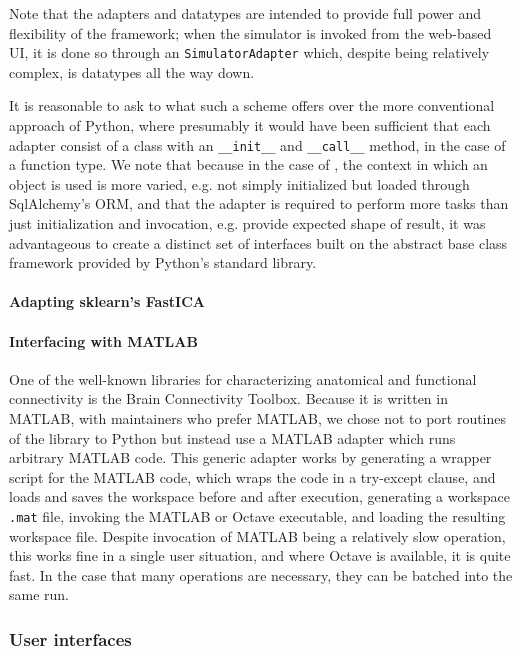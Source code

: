 
Note that the adapters and datatypes are intended to provide full 
power and flexibility of the framework; when the simulator is invoked from
the web-based UI, it is done so through an \texttt{SimulatorAdapter} which,
despite being relatively complex, is datatypes all the way down.

It is reasonable to ask to what such a scheme offers over the more 
conventional approach of Python, where presumably it would have been
sufficient that each adapter consist of a class with an \texttt{\_\_init\_\_}
and \texttt{\_\_call\_\_} method, in the case of a function type. 
We note that because in the case of \TVB, the context in which an object
is used is more varied, e.g. not simply initialized but loaded through 
SqlAlchemy's ORM, and that the adapter is required to perform more tasks
than just initialization and invocation, e.g. provide expected shape of 
result, it was advantageous to create a distinct set of interfaces built
on the abstract base class framework provided by Python's standard library.

\paragraph{Adapting sklearn's FastICA}

\paragraph{Interfacing with MATLAB}

One of the well-known libraries for characterizing anatomical 
and functional connectivity is the Brain Connectivity Toolbox. Because
it is written in MATLAB, with maintainers who prefer MATLAB, we 
chose not to port routines of the library to Python but instead use
a MATLAB adapter which runs arbitrary MATLAB code. This generic
adapter works by generating a wrapper script for the MATLAB code, which
wraps the code in a try-except clause, and loads and saves the workspace
before and after execution, 
generating a workspace \texttt{.mat} file, invoking the MATLAB or Octave
executable, and loading the resulting workspace file. Despite invocation
of MATLAB being a relatively slow operation, this works fine in a single
user situation, and where Octave is available, it is quite fast. In the 
case that many operations are necessary, they can be batched into the 
same run.

\subsubsection{User interfaces}

